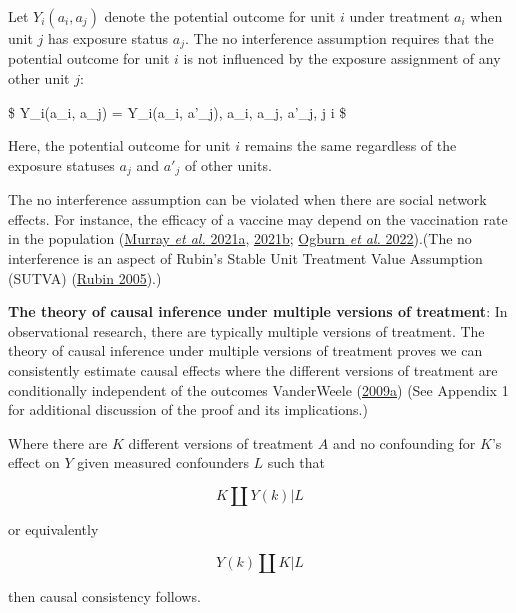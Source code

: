 \documentclass[
  singlecolumn]{article}
\begin{document}
Let \(Y_i(a_i, a_j)\) denote the potential outcome for unit \(i\) under
treatment \(a_i\) when unit \(j\) has exposure status \(a_j\). The no
interference assumption requires that the potential outcome for unit
\(i\) is not influenced by the exposure assignment of any other unit
\(j\):

\$ Y\_i(a\_i, a\_j) = Y\_i(a\_i, a'\_j), \quad \forall a\_i, a\_j,
a'\_j,  \forall j \neq i \$

Here, the potential outcome for unit \(i\) remains the same regardless
of the exposure statuses \(a_j\) and \(a'_j\) of other units.

The no interference assumption can be violated when there are social
network effects. For instance, the efficacy of a vaccine may depend on
the vaccination rate in the population
(\protect\hyperlink{ref-murray2021}{Murray \emph{et al.} 2021a},
\protect\hyperlink{ref-murray2021a}{2021b};
\protect\hyperlink{ref-ogburn2022}{Ogburn \emph{et al.} 2022}).(The no
interference is an aspect of Rubin's Stable Unit Treatment Value
Assumption (SUTVA) (\protect\hyperlink{ref-rubin2005}{Rubin 2005}).)

\textbf{The theory of causal inference under multiple versions of
treatment}: In observational research, there are typically multiple
versions of treatment. The theory of causal inference under multiple
versions of treatment proves we can consistently estimate causal effects
where the different versions of treatment are conditionally independent
of the outcomes VanderWeele
(\protect\hyperlink{ref-vanderweele2009}{2009a}) (See Appendix 1 for
additional discussion of the proof and its implications.)

Where there are \(K\) different versions of treatment \(A\) and no
confounding for \(K\)'s effect on \(Y\) given measured confounders \(L\)
such that

\[
K \coprod Y(k) | L
\]

or equivalently

\[
Y(k) \coprod K | L
\]

then causal consistency follows.
\end{document}
